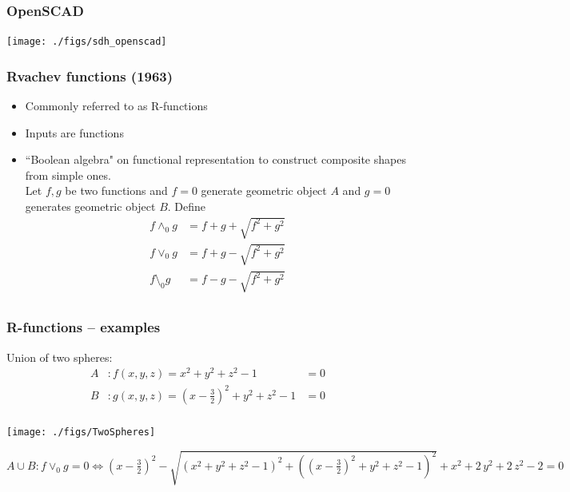 \documentclass{beamer}
\begin{document}
\begin{frame}
\frametitle{OpenSCAD} 
\centerline{\texttt{[image: ./figs/sdh\_openscad]}} 
\end{frame}

\begin{frame} 
\frametitle{Rvachev functions (1963)} 
\begin{itemize} 
\item Commonly referred to as R-functions 
\item Inputs are functions
\item ``Boolean algebra" on functional representation to construct composite shapes from simple ones. \\
Let $f,g$ be two functions and $f=0$ generate geometric object $A$ and $g=0$ generates geometric object $B$. Define 
\[
    \begin{aligned}
    f \land_0 g &= f + g + \sqrt{f^2 + g^2}       \\ 
    f \lor_0 g &= f + g - \sqrt{f^2 + g^2}       \\
    f \setminus_0 g &= f - g - \sqrt{f^2 + g^2}  \\
    \end{aligned}
\]
\end{itemize} 
\end{frame}
\begin{frame}[t] 
\frametitle{R-functions -- examples} 
Union of two spheres:
\[
   \begin{aligned}
   A&: f(x,y,z)=x^2+y^2+z^2 - 1 &= 0 \\
   B&: g(x,y,z)=\left(x-\frac{3}{2}\right)^2+y^2+z^2 - 1 &= 0 \\
   \end{aligned}
\]


\begin{center}
{\tiny
\centerline{\texttt{[image: ./figs/TwoSpheres]}} 
\vspace{-3mm}
$
A \cup B: {f\lor_0 g=0\Leftrightarrow \left(x-\frac{3}{2}\right)}^2-\sqrt{{\left(x^2+y^2+z^2-1\right)}^2+{\left({\left(x-\frac{3}{2}\right)}^2+y^2+z^2-1\right)}^2}+x^2+2\,y^2+2\,z^2-2 = 0$ 
}
\end{center}
\end{frame} 

\end{document}
